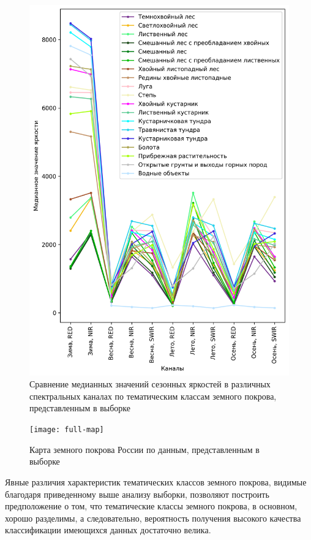 \documentclass[14pt, a4paper, oneside]{extarticle}
\begin{document}
\begin{figure}[H]
    \caption{Сравнение медианных значений сезонных яркостей в различных спектральных каналах по тематическим классам земного покрова, представленным в выборке}
    \centering
    \includegraphics[]{class-comparison}
\end{figure}

\begin{landscape}
\begin{figure}[H]
    \caption{Карта земного покрова России по данным, представленным в выборке}
    \centering
    \texttt{[image: full-map]}
\end{figure}
\end{landscape}

Явные различия характеристик тематических классов земного покрова, видимые благодаря приведенному выше анализу выборки, позволяют построить предположение о том, что тематические классы земного покрова, в основном, хорошо разделимы, а следовательно, вероятность получения высокого качества классификации имеющихся данных достаточно велика.
\end{document}
